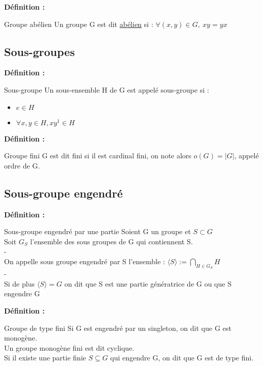 \documentclass{report}
\newenvironment{definition}[1][]{
    \begin{tcolorbox}[colframe= white]
    \textbf{Définition :} 
    #1 \par
    }
    {\end{tcolorbox}}
\newcommand{\dsp}{\displaystyle}
\begin{document}
\begin{definition}{Groupe abélien}
Un groupe G est dit \underline{abélien} si : $\forall (x,y)\in G,~xy=yx$
\end{definition}

\subsection{Sous-groupes}

\begin{definition}{Sous-groupe}
Un sous-ensemble H de G est appelé sous-groupe si :
\begin{itemize}[label=$\bullet$]
\item $e\in H$
\item $\forall x,y \in H, xy^{1}\in H$
\end{itemize}
\end{definition}

\begin{definition}{Groupe fini}
G est dit fini si il est cardinal fini, on note alors $o(G) = |G|$, appelé ordre de G.
\end{definition}


\subsection{Sous-groupe engendré}

\begin{definition}{Sous-groupe engendré par une partie}
Soient G un groupe et $S\subset G$\\
Soit $G_{S}$ l'ensemble des sous groupes de G qui contiennent S. \\
{\color{white}-}\\
On appelle sous groupe engendré par S l'ensemble : $ \dsp\langle S\rangle := \bigcap _{H\in G_{S}}H$\\
{\color{white}-}\\
Si de plus $\langle S\rangle = G$ on dit que S est une partie génératrice de G ou que S engendre G
\end{definition}

\begin{definition}{Groupe de type fini}
Si G est engendré par un singleton, on dit que G est monogène. \\
Un groupe monogène fini est dit cyclique. \\Si il existe une partie finie $S\subseteq G$ qui engendre G, on dit que G est de type fini.
\end{definition}
\end{document}
